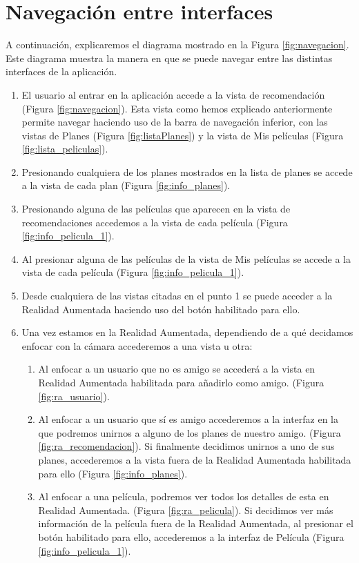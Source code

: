 \section{Navegación entre interfaces}
A continuación, explicaremos el diagrama mostrado en la Figura \ref{fig:navegacion}. Este diagrama muestra la manera en que se puede navegar entre las distintas interfaces
de la aplicación.
\begin{enumerate}
    \item El usuario al entrar en la aplicación accede a la vista de recomendación (Figura \ref{fig:navegacion}). Esta vista como hemos explicado anteriormente
permite navegar haciendo uso de la barra de navegación inferior, con las vistas de Planes (Figura \ref{fig:listaPlanes}) y la vista de Mis películas (Figura \ref{fig:lista_peliculas}).
    \item Presionando cualquiera de los planes mostrados en la lista de planes se accede a la vista de cada plan (Figura \ref{fig:info_planes}).
    \item Presionando alguna de las películas que aparecen en la vista de recomendaciones accedemos a la vista de cada película (Figura \ref{fig:info_pelicula_1}).
    \item Al presionar alguna de las películas de la vista de Mis películas se accede a la vista de cada película (Figura \ref{fig:info_pelicula_1}).
    \item Desde cualquiera de las vistas citadas en el punto 1 se puede acceder a la Realidad Aumentada haciendo uso del botón habilitado para ello.
    \item Una vez estamos en la Realidad Aumentada, dependiendo de a qué decidamos enfocar con la cámara accederemos a una vista u otra:
    \begin{enumerate}
        \item Al enfocar a un usuario que no es amigo se accederá a la vista en Realidad Aumentada habilitada para añadirlo como amigo. (Figura \ref{fig:ra_usuario}).
        \item Al enfocar a un usuario que sí es amigo accederemos a la interfaz en la que podremos unirnos a alguno de los planes de nuestro amigo. (Figura \ref{fig:ra_recomendacion}).
        Si finalmente decidimos unirnos a uno de sus planes, accederemos a la vista fuera de la Realidad Aumentada habilitada para ello (Figura \ref{fig:info_planes}).
        \item Al enfocar a una película, podremos ver todos los detalles de esta en Realidad Aumentada. (Figura \ref{fig:ra_pelicula}). Si decidimos ver más información de la película
        fuera de la Realidad Aumentada, al presionar el botón habilitado para ello, accederemos a la interfaz de Película (Figura \ref{fig:info_pelicula_1}).
    \end{enumerate}
\end{enumerate}

